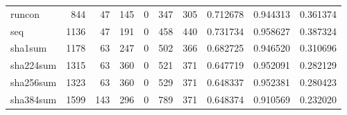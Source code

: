 \begin{longtable}{lrrrrrrrrr}
runcon    &                                 844 &                                              47 &                                            145 &                                             0 &                                            347 &                                          305 &                                           0.712678 &                               0.944313 &                             0.361374 \\
seq       &                                1136 &                                              47 &                                            191 &                                             0 &                                            458 &                                          440 &                                           0.731734 &                               0.958627 &                             0.387324 \\
sha1sum   &                                1178 &                                              63 &                                            247 &                                             0 &                                            502 &                                          366 &                                           0.682725 &                               0.946520 &                             0.310696 \\
sha224sum &                                1315 &                                              63 &                                            360 &                                             0 &                                            521 &                                          371 &                                           0.647719 &                               0.952091 &                             0.282129 \\
sha256sum &                                1323 &                                              63 &                                            360 &                                             0 &                                            529 &                                          371 &                                           0.648337 &                               0.952381 &                             0.280423 \\
sha384sum &                                1599 &                                             143 &                                            296 &                                             0 &                                            789 &                                          371 &                                           0.648374 &                               0.910569 &                             0.232020 \\

\end{longtable}
